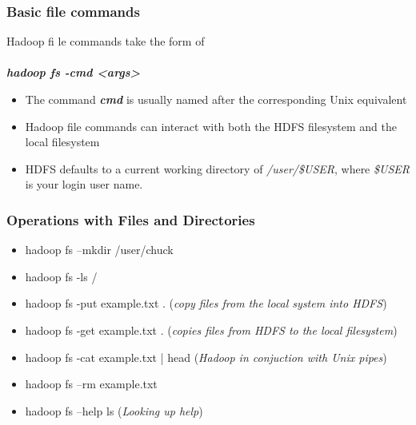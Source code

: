 \documentclass{article}
\begin{document}
\begin{multicols}{2}
\subsubsection {Basic file commands}
Hadoop fi le commands take the form of\\\\
\emph{\textbf{hadoop fs -cmd <args>}}\\
\begin{itemize}
\item The command \emph{\textbf{cmd}} is usually named after the corresponding Unix equivalent
\item Hadoop file commands can interact with both the HDFS filesystem and the local filesystem
\item HDFS defaults to a current working directory of \emph{/user/\$USER}, where \emph{\$USER} is your login user name.
\end{itemize}

\subsubsection {Operations with Files and Directories}
\begin{itemize}
\item hadoop fs –mkdir /user/chuck
\item hadoop fs -ls /
\item hadoop fs -put example.txt . (\emph{copy files from the local system into HDFS})
\item hadoop fs -get example.txt . (\emph{copies files from HDFS to the local filesystem})
\item hadoop fs -cat example.txt | head (\emph{Hadoop in conjuction with Unix pipes})
\item hadoop fs –rm example.txt
\item hadoop fs –help ls (\emph{Looking up help})
\end{itemize}



\end{multicols}
\end{document}
